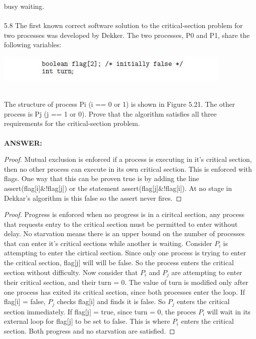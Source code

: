 \documentclass[12pt]{article}
\begin{document}
busy waiting. \\\\
5.8 The first known correct software solution to the critical-section problem
for two processes was developed by Dekker. The two processes, P0 and
P1, share the following variables:\\
\centerline{\includegraphics[scale = 1]{code2.jpg}}\\
The structure of process Pi (i == 0 or 1) is shown in Figure 5.21. The
other process is Pj (j == 1 or 0). Prove that the algorithm satisfies all
three requirements for the critical-section problem.\\\\
\textbf{ANSWER: }
\begin{proof} Mutual exclusion is enforced if a process is executing in 
it's critical section, then no other process can execute in its own 
critical section. This is enforced with flags. One way that this can be proven
true is by adding the line assert(flag[i]\&!flag[j]) or 
the statement assert(flag[j]\&!flag[i]). At no stage in Dekkar's 
algorithm is this false so the assert never fires.
\end{proof}
\begin{proof}
    Progress is enforced when no progress is in a ciritcal section, any process
    that requests entry to the critical section must be permitted to enter without
    delay. No starvation means there is an upper bound on the number of processes 
    that can enter it's critical sections while another is waiting.
    Consider $P_i$ is attempting to enter the cirtical section. 
    Since only one process is trying to enter the critical section, flag[j] will 
    will be false. So the process enters the critical section without difficulty.
    Now consider that $P_i$ and $P_j$ are attempting to enter their critical section, 
    and their turn = 0. The value of turn is modified only after one process has exited 
    its critical section, since both processes enter the loop.
    If flag[i] = false, $P_j$ checks flag[i] and finds it is false. So $P_j$ enters the 
    critical section immediately.  
    If flag[j] = true, since turn = 0, the proces $P_i$ will wait in its external loop for 
    flag[j] to be set to false. This is where $P_i$ enters the critical section. Both progress 
    and no starvation are satisfied.
\end{proof}
\end{document}
